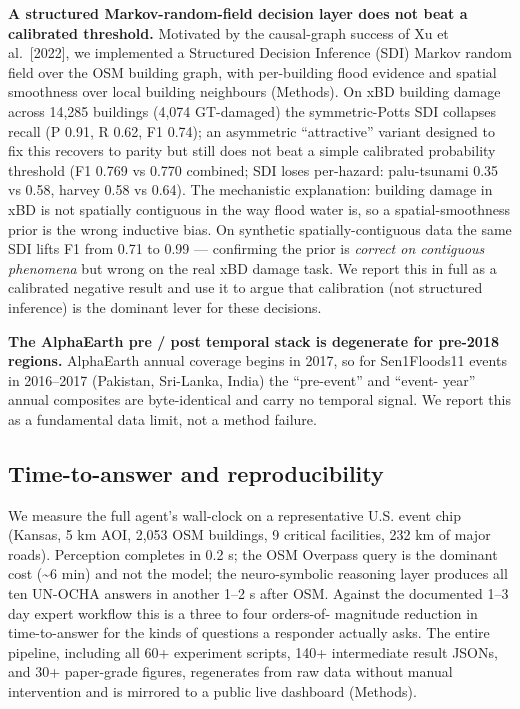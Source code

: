 \documentclass[sn-nature,lineno]{sn-jnl}
\theoremstyle{thmstyleone}
\theoremstyle{thmstyletwo}
\theoremstyle{thmstylethree}
\begin{document}
\textbf{A structured Markov-random-field decision layer does not beat a calibrated
threshold.} Motivated by the causal-graph success of Xu et al.~{[}2022{]}, we
implemented a Structured Decision Inference (SDI) Markov random field over
the OSM building graph, with per-building flood evidence and spatial
smoothness over local building neighbours (Methods). On xBD building damage
across 14,285 buildings (4,074 GT-damaged) the symmetric-Potts SDI collapses
recall (P 0.91, R 0.62, F1 0.74); an asymmetric ``attractive'' variant designed
to fix this recovers to parity but still does not beat a simple calibrated
probability threshold (F1 0.769 vs 0.770 combined; SDI loses per-hazard:
palu-tsunami 0.35 vs 0.58, harvey 0.58 vs 0.64). The mechanistic explanation:
building damage in xBD is not spatially contiguous in the way flood water is,
so a spatial-smoothness prior is the wrong inductive bias. On synthetic
spatially-contiguous data the same SDI lifts F1 from 0.71 to 0.99 ---
confirming the prior is \emph{correct on contiguous phenomena} but wrong on the
real xBD damage task. We report this in full as a calibrated negative result
and use it to argue that calibration (not structured inference) is the
dominant lever for these decisions.

\textbf{The AlphaEarth pre / post temporal stack is degenerate for pre-2018
regions.} AlphaEarth annual coverage begins in 2017, so for Sen1Floods11
events in 2016--2017 (Pakistan, Sri-Lanka, India) the ``pre-event'' and ``event-
year'' annual composites are byte-identical and carry no temporal signal. We
report this as a fundamental data limit, not a method failure.

\subsection{Time-to-answer and reproducibility}\label{time-to-answer-and-reproducibility}

We measure the full agent's wall-clock on a representative U.S. event chip
(Kansas, 5 km AOI, 2,053 OSM buildings, 9 critical facilities, 232 km of
major roads). Perception completes in 0.2 s; the OSM Overpass query is the
dominant cost (\textasciitilde6 min) and not the model; the neuro-symbolic reasoning layer
produces all ten UN-OCHA answers in another 1--2 s after OSM. Against the
documented 1--3 day expert workflow this is a three to four orders-of-
magnitude reduction in time-to-answer for the kinds of questions a responder
actually asks. The entire pipeline, including all 60+ experiment scripts,
140+ intermediate result JSONs, and 30+ paper-grade figures, regenerates
from raw data without manual intervention and is mirrored to a public live
dashboard (Methods).
\end{document}
